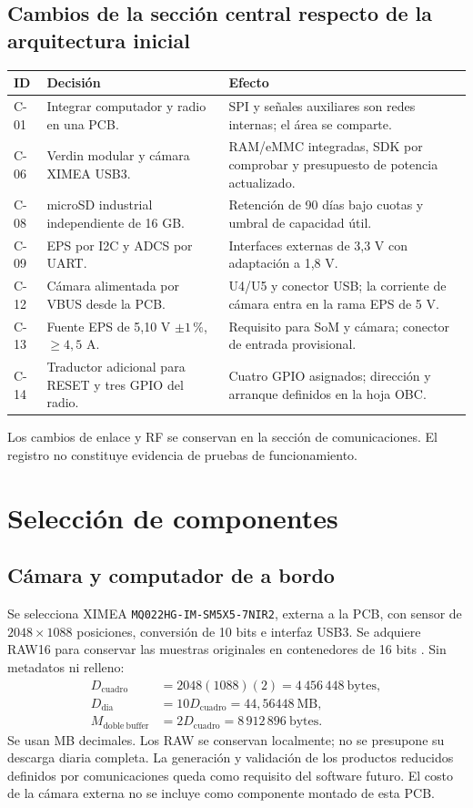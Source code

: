 \documentclass[11pt,letterpaper]{article}
\begin{document}
\subsection{Cambios de la sección central respecto de la arquitectura inicial}
\begin{tabularx}{\textwidth}{L{1cm}XX}
\toprule ID & Decisión & Efecto \\
\midrule
C-01 & Integrar computador y radio en una PCB. & SPI y señales auxiliares son redes internas; el área se comparte. \\
C-06 & Verdin modular y cámara XIMEA USB3. & RAM/eMMC integradas, SDK por comprobar y presupuesto de potencia actualizado. \\
C-08 & microSD industrial independiente de 16 GB. & Retención de 90 días bajo cuotas y umbral de capacidad útil. \\
C-09 & EPS por I2C y ADCS por UART. & Interfaces externas de 3,3 V con adaptación a 1,8 V. \\
C-12 & Cámara alimentada por VBUS desde la PCB. & U4/U5 y conector USB; la corriente de cámara entra en la rama EPS de 5 V. \\
C-13 & Fuente EPS de 5,10 V $\pm1\,\%$, $\geq4,5$ A. & Requisito para SoM y cámara; conector de entrada provisional. \\
C-14 & Traductor adicional para RESET y tres GPIO del radio. & Cuatro GPIO asignados; dirección y arranque definidos en la hoja OBC. \\
\bottomrule
\end{tabularx}
Los cambios de enlace y RF se conservan en la sección de comunicaciones. El registro no constituye evidencia de pruebas de funcionamiento.

\section{Selección de componentes}
\subsection{Cámara y computador de a bordo}
Se selecciona XIMEA \texttt{MQ022HG-IM-SM5X5-7NIR2}, externa a la PCB, con sensor de $2048\times1088$ posiciones, conversión de 10 bits e interfaz USB3. Se adquiere RAW16 para conservar las muestras originales en contenedores de 16 bits \cite{ximea7nir2,ximeamanual}. Sin metadatos ni relleno:
\begin{align}
D_{\mathrm{cuadro}}&=2048(1088)(2)=4\,456\,448\ \mathrm{bytes},\\
D_{\mathrm{dia}}&=10D_{\mathrm{cuadro}}=44,56448\ \mathrm{MB},\\
M_{\mathrm{doble\ buffer}}&=2D_{\mathrm{cuadro}}=8\,912\,896\ \mathrm{bytes}.
\end{align}
Se usan MB decimales. Los RAW se conservan localmente; no se presupone su descarga diaria completa. La generación y validación de los productos reducidos definidos por comunicaciones queda como requisito del software futuro. El costo de la cámara externa no se incluye como componente montado de esta PCB.
\end{document}

